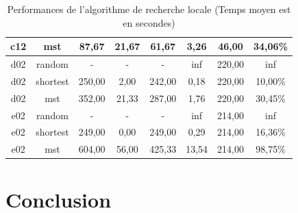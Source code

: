 \documentclass[10pt]{article}
\begin{document}
\begin{table}[h!]
\begin{tabular}{|c|c|c|c|c|c|c|c|}
c12 & mst & 87,67 & 21,67 & 61,67 & 3,26 & 46,00 & 34,06\% \\
\hline
d02 & random & - & - & - & inf & 220,00 & inf \\
d02 & shortest & 250,00 & 2,00 & 242,00 & 0,18 & 220,00 & 10,00\% \\
d02 & mst & 352,00 & 21,33 & 287,00 & 1,76 & 220,00 & 30,45\% \\
\hline
e02 & random & - & - & - & inf & 214,00 & inf \\
e02 & shortest & 249,00 & 0,00 & 249,00 & 0,29 & 214,00 & 16,36\% \\
e02 & mst & 604,00 & 56,00 & 425,33 & 13,54 & 214,00 & 98,75\% \\
\hline
		\end{tabular}
		\caption{Performances de l'algorithme de recherche locale (Temps moyen est en secondes)}
		\label{tab-perfls}
	\end{table}





\section{Conclusion}



	
\end{document}
